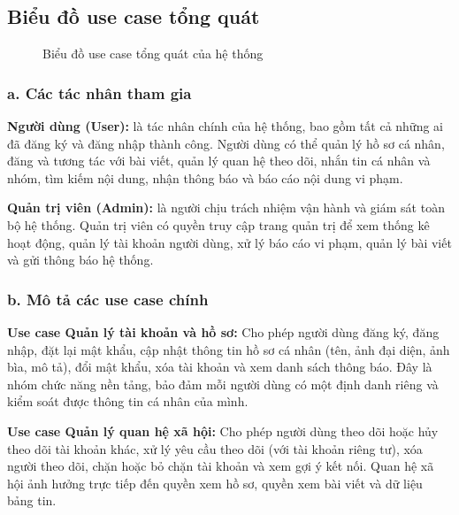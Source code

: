\documentclass[../DoAn.tex]{subfiles}
\begin{document}
\subsection{Biểu đồ use case tổng quát}
\label{subsection:2.2.1}

\begin{figure}[H]
\centering
{}
\caption{Biểu đồ use case tổng quát của hệ thống}
\label{fig:use-case-overview}
\end{figure}

    \subsubsection*{a. Các tác nhân tham gia}

    \textbf{Người dùng (User):} là tác nhân chính của hệ thống, bao gồm tất cả những ai đã đăng ký và đăng nhập thành công. Người dùng có thể quản lý hồ sơ cá nhân, đăng và tương tác với bài viết, quản lý quan hệ theo dõi, nhắn tin cá nhân và nhóm, tìm kiếm nội dung, nhận thông báo và báo cáo nội dung vi phạm.

    \textbf{Quản trị viên (Admin):} là người chịu trách nhiệm vận hành và giám sát toàn bộ hệ thống. Quản trị viên có quyền truy cập trang quản trị để xem thống kê hoạt động, quản lý tài khoản người dùng, xử lý báo cáo vi phạm, quản lý bài viết và gửi thông báo hệ thống.

    \subsubsection*{b. Mô tả các use case chính}

    \textbf{Use case Quản lý tài khoản và hồ sơ:} Cho phép người dùng đăng ký, đăng nhập, đặt lại mật khẩu, cập nhật thông tin hồ sơ cá nhân (tên, ảnh đại diện, ảnh bìa, mô tả), đổi mật khẩu, xóa tài khoản và xem danh sách thông báo. Đây là nhóm chức năng nền tảng, bảo đảm mỗi người dùng có một định danh riêng và kiểm soát được thông tin cá nhân của mình.

    \textbf{Use case Quản lý quan hệ xã hội:} Cho phép người dùng theo dõi hoặc hủy theo dõi tài khoản khác, xử lý yêu cầu theo dõi (với tài khoản riêng tư), xóa người theo dõi, chặn hoặc bỏ chặn tài khoản và xem gợi ý kết nối. Quan hệ xã hội ảnh hưởng trực tiếp đến quyền xem hồ sơ, quyền xem bài viết và dữ liệu bảng tin.
\end{document}
